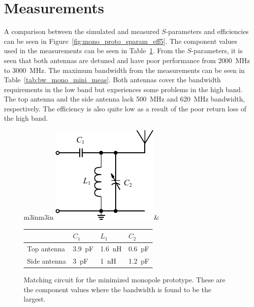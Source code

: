 \FloatBarrier
\section{Measurements}
A comparison between the simulated and measured $S$-parameters and efficiencies can be seen in Figure~\ref{fig:mono_proto_sparam_eff5}. The component values used in the measurements can be seen in Table~\ref{fig:matching_mono_mini_meas}. From the $S$-parameters, it is seen that both antennas are detuned and have poor performance from \SI{2000}{MHz} to \SI{3000}{MHz}. The maximum bandwidth from the measurements can be seen in Table~\ref{tab:bw_mono_mini_meas}. Both antennas cover the bandwidth requirements in the low band but experiences some problems in the high band. The top antenna and the side antenna lack \SI{500}{MHz} and \SI{620}{MHz} bandwidth, respectively. 
The efficiency is also quite low as a result of the poor return loss of the high band.

\begin{figure}[htbp]
        \centering
        \begin{tabular}{m{3in}m{3in}}
            \centering
            \includegraphics{img/tech_sol/schematic_tuning_1}&
            \centering
            \footnotesize
            \begin{tabular}{|l|l|l|l|}
                \hline
                & $C_1$ & $L_1$ & $C_2$ \\
                \hline
              Top antenna & \SI{3.9}{pF} & \SI{1.6}{nH} & \SI{0.6}{pF} \\
                Side antenna & \SI{3}{pF} & \SI{1}{nH} & \SI{1.2}{pF} \\
                \hline
            \end{tabular}
        \end{tabular}
    \caption{Matching circuit for the minimized monopole prototype. These are the component values where the bandwidth is found to be the largest.}
    \label{fig:matching_mono_mini_meas}
\end{figure}

